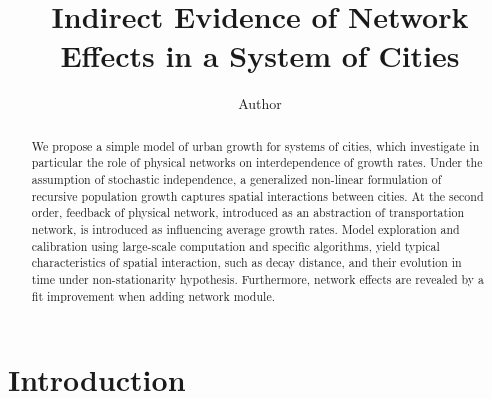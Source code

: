 \documentclass[Royal,sageh,times]{sagej}
\begin{document}

\title{Indirect Evidence of Network Effects in a System of Cities}

\author{Author}




\email{}



\begin{abstract}
We propose a simple model of urban growth for systems of cities, which investigate in particular the role of physical networks on interdependence of growth rates. Under the assumption of stochastic independence, a generalized non-linear formulation of recursive population growth captures spatial interactions between cities. At the second order, feedback of physical network, introduced as an abstraction of transportation network, is introduced as influencing average growth rates. Model exploration and calibration using large-scale computation and specific algorithms, yield typical characteristics of spatial interaction, such as decay distance, and their evolution in time under non-stationarity hypothesis. Furthermore, network effects are revealed by a fit improvement when adding network module.
\end{abstract}


\maketitle







\section*{Introduction}
\end{document}
